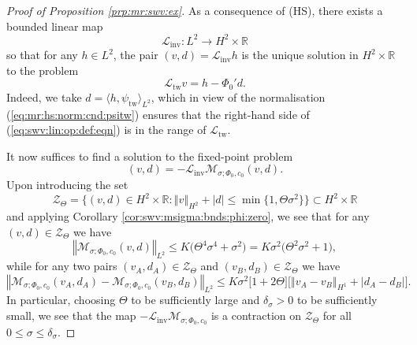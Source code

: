 \documentclass[10pt]{articleHJ}
\newcommand{\Real}{\mathbb{R}}							%
\newcommand{\abs}[1]{\left\vert#1\right\vert}			%
\newcommand{\norm}[1]{\left\Vert#1\right\Vert}		%
\newcommand{\sref}[1]{(\ref{#1})}                       %
\numberwithin{equation}{section}
\begin{document}
\begin{proof}[Proof of Proposition \ref{prp:mr:swv:ex}]
As a consequence of (HS), there exists a bounded
linear map
\begin{equation}
\mathcal{L}_{\mathrm{inv}}: L^2 \to H^2 \times \Real
\end{equation}
so that for any $h \in L^2$,
the pair $(v, d) = \mathcal{L}_{\mathrm{inv}} h$
is the unique solution in $H^2 \times \Real$
to the problem
\begin{equation}
\label{eq:swv:lin:op:def:eqn}
\mathcal{L}_{\mathrm{tw}} v
= h - \Phi_0' d .
\end{equation}
Indeed, we take $d = \langle h , \psi_{\mathrm{tw}} \rangle_{L^2}$,
which in view of the normalisation
\sref{eq:mr:hs:norm:cnd:psitw}
ensures that the right-hand side
of \sref{eq:swv:lin:op:def:eqn} is in the range
of $\mathcal{L}_{\mathrm{tw}}$.

It now suffices to find a solution
to the fixed-point problem
\begin{equation}
(v, d) = -\mathcal{L}_{\mathrm{inv}}
\mathcal{M}_{\sigma;\Phi_0, c_0}(v , d).
\end{equation}
Upon introducing the set
\begin{equation}
\mathcal{Z}_{\Theta} = \big\{ (v, d) \in H^2 \times \Real:
\norm{v}_{H^2} +  \abs{d} \le \min\{ 1 , \Theta \sigma^2 \} \big\}
 \subset H^2 \times \Real
\end{equation}
and applying Corollary \ref{cor:swv:msigma:bnds:phi:zero},
we see that for any $(v, d) \in \mathcal{Z}_{\Theta}$
we have
\begin{equation}
\norm{
  \mathcal{M}_{\sigma;\Phi_0, c_0}(v , d)
}_{L^2} \le
 K \big( \Theta^4 \sigma^4 + \sigma^2 \big)
 = K \sigma^2 \big( \Theta^2 \sigma^2 + 1 \big) ,
\end{equation}
while for any two pairs
$(v_A, d_A) \in \mathcal{Z}_{\Theta}$
and $(v_B , d_B) \in \mathcal{Z}_{\Theta}$
we have
\begin{equation}
\norm{
  \mathcal{M}_{\sigma;\Phi_0, c_0}(v_A , d_A)
  - \mathcal{M}_{\sigma;\Phi_0, c_0}(v_B , d_B)
}_{L^2} \le
K \sigma^2 \big[ 1 + 2 \Theta\big]
 \big[
   \norm{v_A - v_B}_{H^1}
   + \abs{d_A - d_B}
 \big].
\end{equation}
In particular, choosing
$\Theta$ to be sufficiently large
and $\delta_{\sigma} > 0$
to be sufficiently small,
we see that the map
$-\mathcal{L}_{\mathrm{inv}}
\mathcal{M}_{\sigma;\Phi_0, c_0}$
is a contraction on $\mathcal{Z}_{\Theta}$
for all $0 \le \sigma \le \delta_{\sigma}$.
\end{proof}
\end{document}
